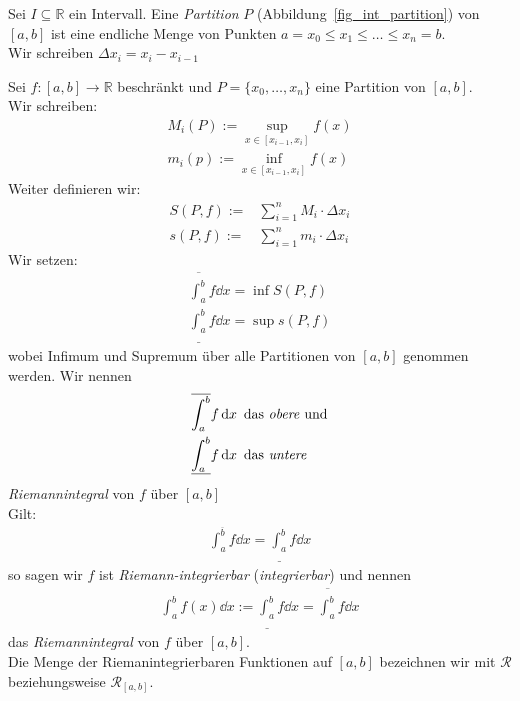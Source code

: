 \begin{Definition}{
	Sei $ I \subseteq \mathbb{R}$ ein Intervall. Eine \emph{Partition}  $P$ 
	(Abbildung~\ref{fig_int_partition}) von 
	$[a,b]$ ist eine endliche Menge von Punkten $a = x_0 \leq x_1 \leq \hdots
	\leq x_n = b$.\\
	Wir schreiben $\Delta x_i = x_i - x_{i-1}$
	
}\end{Definition}

\begin{Definition}{ \label{def_riemann-integrierbar}
	Sei $f : [a,b] \rightarrow \mathbb{R}$ beschränkt und $P = \{x_0, \hdots, x_n\}$ 
	eine Partition von $[a,b]$.\\
	Wir schreiben: 
	\begin{align*}
		M_i(P) := \sup_{x \in [x_{i-1}, x_i]} f(x) \\
		m_i(p) := \inf_{x \in [x_{i-1}, x_i]} f(x)
	\end{align*}
	Weiter definieren wir: 
	\begin{align*}
		S(P,f) := & \sum_{i=1}^n M_i \cdot \Delta x_i \\
		s(P,f) := & \sum_{i=1}^n m_i \cdot \Delta x_i
	\end{align*}
	Wir setzen:
	\begin{align*}
		\overline{\int_a^b} f \dd{x} = \inf S(P,f) \\
		\underline{\int_a^b} f \dd{x} = \sup s(P,f)
	\end{align*}
	wobei Infimum und Supremum über alle Partitionen von $[a,b]$ genommen werden. 
	Wir nennen 
	\begin{align*}
		& \overline{\int_a^b} f \dd{x} \text{ das \emph{obere} und} \\
		& \underline{\int_a^b} f \dd{x} \text{ das \emph{untere}}
	\end{align*}
	\emph{Riemannintegral} von $f$ über $[a,b]$ \\
	Gilt:
	\begin{align*}
		\int_a^{\overline{b}} f \dd{x} = \underline{\int_{a}^b} f \dd{x}
	\end{align*}
	so sagen wir $f$ ist \emph{Riemann-integrierbar} (\emph{integrierbar}) 
	und nennen 
	\begin{align*}
		\int_a^b f(x) \dd{x} := \underline{\int_a^b} f \dd{x} = 
		\overline{\int_a^b} f \dd{x}
	\end{align*}
	das \emph{Riemannintegral} von $f$ über $[a,b]$.\\
	Die Menge der Riemanintegrierbaren Funktionen auf $[a,b]$ bezeichnen wir 
	mit $\mathcal{R}$ beziehungsweise $\mathcal{R}_{[a,b]}$.
	
}\end{Definition}

